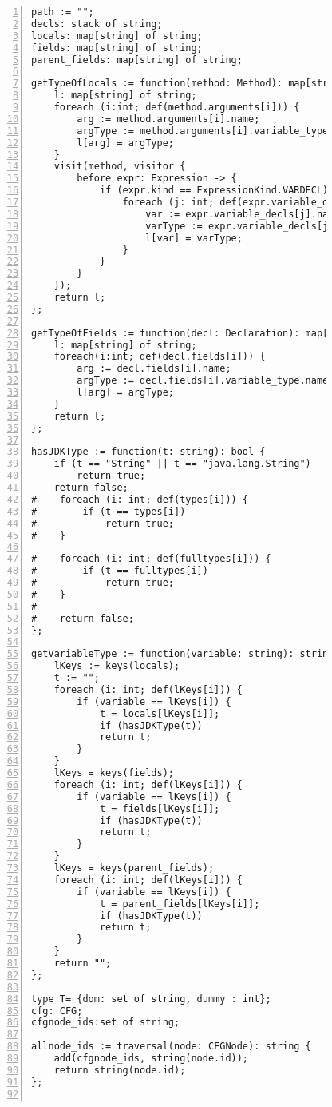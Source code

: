 \begin{figure}[ht!]
\begin{lstlisting}[numbers=left, tabsize=4, escapechar=@, caption={API Precondition Mining Analysis},label={lst:apm-code}, lastline = 10]
path := "";
decls: stack of string;
locals: map[string] of string;
fields: map[string] of string;
parent_fields: map[string] of string;

getTypeOfLocals := function(method: Method): map[string] of string {
    l: map[string] of string;
    foreach (i:int; def(method.arguments[i])) {
        arg := method.arguments[i].name;
        argType := method.arguments[i].variable_type.name;
        l[arg] = argType;
    }
    visit(method, visitor {
        before expr: Expression -> {            
            if (expr.kind == ExpressionKind.VARDECL) {
                foreach (j: int; def(expr.variable_decls[j])) {
                    var := expr.variable_decls[j].name;
                    varType := expr.variable_decls[j].variable_type.name;
                    l[var] = varType;
                }
            }
        }
    });
    return l;
};

getTypeOfFields := function(decl: Declaration): map[string] of string {
    l: map[string] of string;
    foreach(i:int; def(decl.fields[i])) {
        arg := decl.fields[i].name;
        argType := decl.fields[i].variable_type.name;
        l[arg] = argType;
    }
    return l;
};

hasJDKType := function(t: string): bool {
    if (t == "String" || t == "java.lang.String")
        return true;
    return false;
#    foreach (i: int; def(types[i])) {
#        if (t == types[i])
#            return true;
#    }
    
#    foreach (i: int; def(fulltypes[i])) {
#        if (t == fulltypes[i])
#            return true;
#    }
#    
#    return false;    
};

getVariableType := function(variable: string): string {
    lKeys := keys(locals);
    t := "";
    foreach (i: int; def(lKeys[i])) {
        if (variable == lKeys[i]) {
            t = locals[lKeys[i]];
            if (hasJDKType(t))
            return t;
        }
    }
    lKeys = keys(fields);
    foreach (i: int; def(lKeys[i])) {
        if (variable == lKeys[i]) {
            t = fields[lKeys[i]];
            if (hasJDKType(t))
            return t;
        }
    }
    lKeys = keys(parent_fields);
    foreach (i: int; def(lKeys[i])) {
        if (variable == lKeys[i]) {
            t = parent_fields[lKeys[i]];
            if (hasJDKType(t))
            return t;
        }
    }
    return "";
}; 

type T= {dom: set of string, dummy : int};
cfg: CFG;
cfgnode_ids:set of string;

allnode_ids := traversal(node: CFGNode): string {
	add(cfgnode_ids, string(node.id));
	return string(node.id);
};


\end{lstlisting}
\end{figure}
